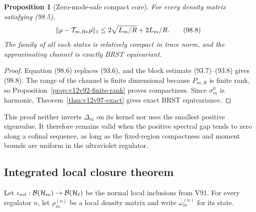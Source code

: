 \documentclass[11pt]{article}
\newtheorem{proposition}[theorem]{Proposition}
\theoremstyle{remark}
\begin{document}
\begin{proposition}[Zero-mode-safe compact core]
\label{prop:v12v98-core}
For every density matrix satisfying (98.5),
\[
 \|\rho-{\cal T}_{m,R*}\rho\|_1
 \leq2\sqrt{L_m/R}+2L_m/R.                                     \tag{98.8}
\]
The family of all such states is relatively compact in trace norm,
and the approximating channel is exactly BRST equivariant.
\end{proposition}

\begin{proof}
Equation (98.6) replaces (93.6), and the block estimate
(93.7)--(93.8) gives (98.8).  The range of the channel is finite
dimensional because \(P_{m,R}\) is finite rank, so
Proposition~\ref{prop:v12v92-finite-rank} proves compactness.
Since \(\sigma_m^0\) is harmonic,
Theorem~\ref{thm:v12v97-exact} gives exact BRST equivariance.
\end{proof}

This proof neither inverts \(\Delta_m\) on its kernel nor uses the
smallest positive eigenvalue.  It therefore remains valid when the
positive spectral gap tends to zero along a cofinal sequence, as
long as the fixed-region compactness and moment bounds are uniform
in the ultraviolet regulator.

\subsection{Integrated local closure theorem}

Let \(\iota_{m\ell}:{\cal B}({\cal H}_m)\to
{\cal B}({\cal H}_\ell)\) be the normal local inclusions from V91.
For every regulator \(n\), let \(\rho_m^{(n)}\) be a local density
matrix and write \(\omega_m^{(n)}\) for its state.
\end{document}
